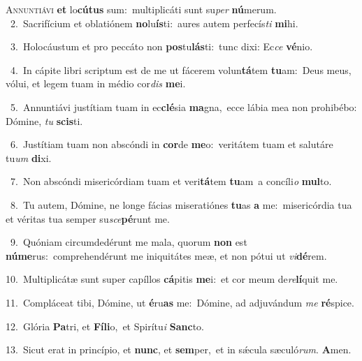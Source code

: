 \lettrine{\initial\textcolor{\initialcolor}{A}}{nnuntiávi} \textbf{et} lo\-\textbf{cú}\-\textbf{tus} sum:~\star multiplicáti sunt su\textit{per} \textbf{nú}\-merum.\\
{\numbfont\textcolor{\numbcolor}{~2.}}~Sacrifícium et oblatiónem \textbf{no}\-lu\-\textbf{ís}\-ti:~\star aures autem perfecís\textit{ti} \textbf{mi}\-hi.\par
{\numbfont\textcolor{\numbcolor}{~3.}}~Holocáustum et pro peccáto non \textbf{pos}\-tu\-\textbf{lás}\-ti:~\star tunc dixi: Ec\textit{ce} \textbf{vé}\-nio.\par
{\numbfont\textcolor{\numbcolor}{~4.}}~In cápite libri scriptum est de me ut fácerem volun\-\textbf{tá}\-tem \textbf{tu}\-am:~\star Deus meus, vólui, et legem tuam in médio cor\textit{dis} \textbf{me}\-i.\par
{\numbfont\textcolor{\numbcolor}{~5.}}~Annuntiávi justítiam tuam in ec\-\textbf{clé}\-sia \textbf{ma}\-gna,~\star ecce lábia mea non prohibébo: Dómine, \textit{tu} \textbf{scis}\-ti.\par
{\numbfont\textcolor{\numbcolor}{~6.}}~Justítiam tuam non abscóndi in \textbf{cor}\-de \textbf{me}\-o:~\star veritátem tuam et salutáre tu\textit{um} \textbf{di}\-xi.\par
{\numbfont\textcolor{\numbcolor}{~7.}}~Non abscóndi misericórdiam tuam et veri\-\textbf{tá}\-tem \textbf{tu}\-am~\star a concíli\textit{o} \textbf{mul}\-to.\par
{\numbfont\textcolor{\numbcolor}{~8.}}~Tu autem, Dómine, ne longe fácias miseratiónes \textbf{tu}\-as \textbf{a} me:~\star misericórdia tua et véritas tua semper su\-\textit{sce}\-\textbf{pé}runt me.\par
{\numbfont\textcolor{\numbcolor}{~9.}}~Quóniam circumdedérunt me mala, quorum \textbf{non} est \textbf{nú}\-\textbf{me}rus:~\star comprehendérunt me iniquitátes meæ, et non pótui ut \textit{vi}\-\textbf{dé}rem.\par
{\numbfont\textcolor{\numbcolor}{10.}}~Multiplicátæ sunt super capíllos \textbf{cá}\-pitis \textbf{me}\-i:~\star et cor meum de\-\textit{re}\-\textbf{lí}quit me.\par
{\numbfont\textcolor{\numbcolor}{11.}}~Compláceat tibi, Dómine, ut \textbf{é}\-ru\textbf{as} me:~\star Dómine, ad adjuvándum \textit{me} \textbf{ré}\-spice.\par
{\numbfont\textcolor{\numbcolor}{12.}}~Glória \textbf{Pa}\-tri, et \textbf{Fí}\-\textbf{li}o,~\star et Spirítu\textit{i} \textbf{Sanc}\-to.\par
{\numbfont\textcolor{\numbcolor}{13.}}~Sicut erat in princípio, et \textbf{nunc}\-, et \textbf{sem}\-per,~\star et in sǽcula sæculó\-\textit{rum}\-. \textbf{A}\-men.\par
